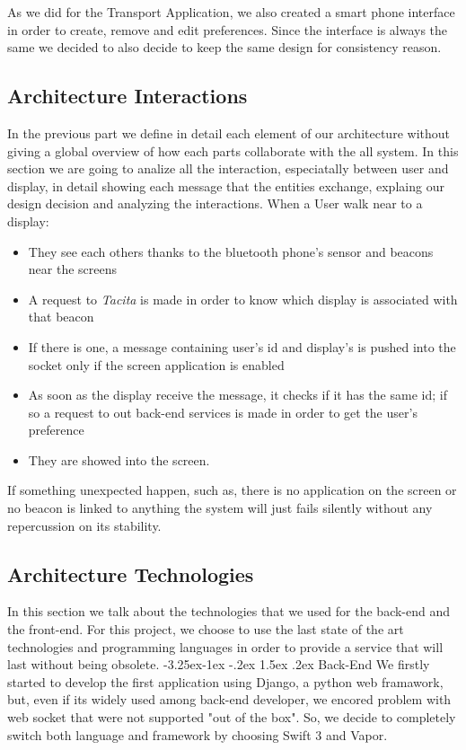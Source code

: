 \documentclass[]{usiinfbachelorproject}
\makeatletter
\newcommand\subsubsection{\@startsection{subsubsection}{3}{\z@}%
                {-3.25ex\@plus -1ex \@minus -.2ex}%
                {1.5ex \@plus .2ex}%
                {\normalfont\normalsize\bfseries}}
\makeatother
\begin{document}
As we did for the Transport Application, we also created a smart phone interface in order to create, remove and edit preferences. Since the interface is always the same we decided to also decide to keep the same design for consistency reason.
\subsection{Architecture Interactions}
In the previous part we define in detail each element of our architecture without giving a global overview of how each parts collaborate with the all system. In this section we are going to analize all the interaction, especiatally between user and display, in detail showing each message that the entities exchange, explaing our design decision and analyzing the interactions.
When a User walk near to a display:
\begin{itemize}
	\item They see each others thanks to the bluetooth phone's sensor and beacons near the screens
	\item A request to \emph{Tacita} is made in order to know which display is associated with that beacon
	\item If there is one, a message containing user's id and display's is pushed into the socket only if the screen application is enabled
	\item As soon as the display receive the message, it checks if it has the same id; if so a request to out back-end services is made in order to get the user's preference
	\item They are showed into the screen.
\end{itemize}
If something unexpected happen, such as, there is no application on the screen or no beacon is linked to anything the system will just fails silently without any repercussion on its stability.
 

\subsection{Architecture Technologies}
In this section we talk about the technologies that we used for the back-end and the front-end. For this project, we choose to use the last state of the art technologies and programming languages in order to provide a service that will last without being obsolete.
\subsubsection{Back-End}
We firstly started to develop the first application using Django, a python web framawork, but, even if its widely used among back-end developer, we encored problem with web socket that were not supported "out of the box".
So, we decide to completely switch both language and framework by choosing Swift 3 and Vapor.
\end{document}
